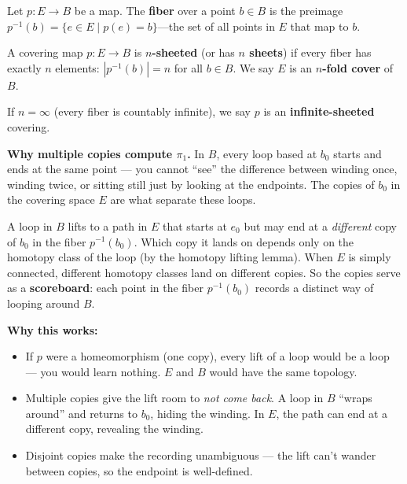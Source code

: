 \documentclass[11pt]{report}
\begin{document}
\begin{defbox}[Fiber]
Let $p: E \to B$ be a map. The \textbf{fiber} over a point $b \in B$ is the preimage $p^{-1}(b) = \{e \in E \mid p(e) = b\}$---the set of all points in $E$ that map to $b$.
\end{defbox}

\begin{defbox}
A covering map $p: E \to B$ is \textbf{$n$-sheeted} (or has \textbf{$n$ sheets}) if every fiber has exactly $n$ elements: $|p^{-1}(b)| = n$ for all $b \in B$. We say $E$ is an \textbf{$n$-fold cover} of $B$.

If $n = \infty$ (every fiber is countably infinite), we say $p$ is an \textbf{infinite-sheeted} covering.
\end{defbox}

\begin{rembox}
\textbf{Why multiple copies compute $\pi_1$.} In $B$, every loop based at $b_0$ starts and ends at the same point --- you cannot ``see'' the difference between winding once, winding twice, or sitting still just by looking at the endpoints. The copies of $b_0$ in the covering space $E$ are what separate these loops.

A loop in $B$ lifts to a path in $E$ that starts at $e_0$ but may end at a \emph{different} copy of $b_0$ in the fiber $p^{-1}(b_0)$. Which copy it lands on depends only on the homotopy class of the loop (by the homotopy lifting lemma). When $E$ is simply connected, different homotopy classes land on different copies. So the copies serve as a \textbf{scoreboard}: each point in the fiber $p^{-1}(b_0)$ records a distinct way of looping around $B$.

\textbf{Why this works:}
\begin{itemize}[nosep]
    \item If $p$ were a homeomorphism (one copy), every lift of a loop would be a loop --- you would learn nothing. $E$ and $B$ would have the same topology.
    \item Multiple copies give the lift room to \emph{not come back}. A loop in $B$ ``wraps around'' and returns to $b_0$, hiding the winding. In $E$, the path can end at a different copy, revealing the winding.
    \item Disjoint copies make the recording unambiguous --- the lift can't wander between copies, so the endpoint is well-defined.
\end{itemize}


\end{rembox}
\end{document}
